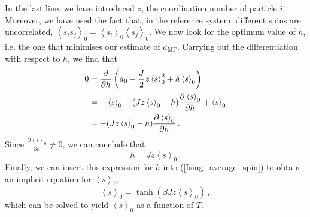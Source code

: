\documentclass{article}
\theoremstyle{plain}\theoremheaderfont{\normalfont\bfseries}\theorembodyfont{\rmfamily}\theoremseparator{.}\newtheorem*{thm}{Theorem}\newtheorem*{law}{Law}\newtheorem*{pos}{Postulate}
\numberwithin{equation}{section}
\newcommand{\pdv}[3][]{\frac{\partial^{#1} #2}{{\partial #3}^{#1}}}
\newcommand{\eval}[1]{\left\langle #1 \right\rangle}
\begin{document}
    In the last line, we have introduced \(z\), the coordination number of particle \(i\). Moreover, we have used the fact that, in the reference system, different spins are uncorrelated, \(\eval{s_is_j}_0=\eval{s_i}_0\eval{s_j}_0\). We now look for the optimum value of \(h\), i.e. the one that minimises our estimate of \(a_{\text{MF}}\). Carrying out the differentiation with respect to \(h\), we find that
    \begin{align}
        0&=\pdv{}{h}\left(a_0-\frac{J}{2}z\eval{s}_0^2+h\eval{s}_0\right)\notag\\
        &=-\eval{s}_0-(Jz\eval{s}_0-h)\pdv{\eval{s}_0}{h}+\eval{s}_0\notag\\
        &=-(Jz\eval{s}_0-h)\pdv{\eval{s}_0}{h}\,.
    \end{align}
    Since \(\pdv{\eval{s}_0}{h}\ne 0\), we can conclude that
    \begin{equation}\label{Ising_mean_field_strength}
        h=Jz\eval{s}_0\,.
    \end{equation}
    Finally, we can insert this expression for \(h\) into (\ref{Ising_average_spin}) to obtain an implicit equation for \(\eval{s}_0\),
    \begin{equation}\label{Ising_equilibrium_condition}
        \eval{s}_0=\tanh(\beta Jz\eval{s}_0)\,,
    \end{equation}
    which can be solved to yield \(\eval{s}_0\) as a function of \(T\).
\end{document}
